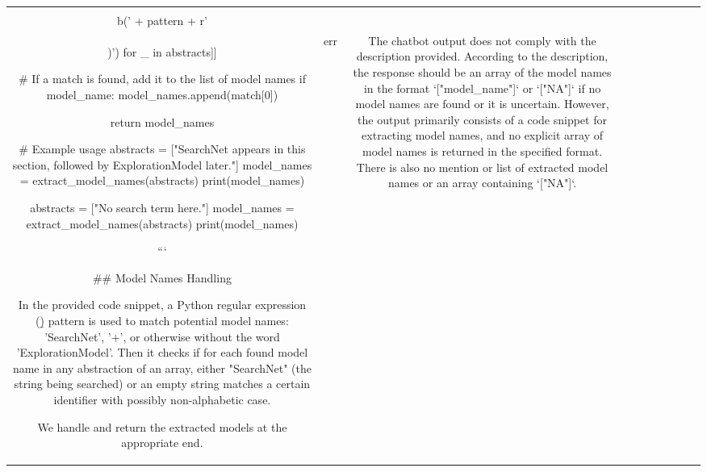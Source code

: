 \begin{table}[h!]
\begin{tabular}{|c|c|c|c|c|c|c|c|c|c|}
\[\[\[Here's how you can achieve this in Python:

```python
import re

def extract_model_names(abstracts):
    # Regular expression pattern to match model names
    pattern = r'\b(?:SearchNet|\w+)\s+([\_A-Z][a-z]+)\.?\w+\b'
    
    # Find model names in the abstracts
    model_names = []
    for abstract in abstracts:
        matches = re.findall(pattern, abstract)
        
        # Check if either "SearchNet" or "\w+" was found
        model_name = [match[0] if match[1] in ['SearchNet', '': None] else match[1] 
                     for match in [match.match('\\b(' + pattern + r'\\)') for _ in abstracts]]
        
        # If a match is found, add it to the list of model names
        if model_name:
            model_names.append(match[0])
    
    return model_names

# Example usage
abstracts = ["SearchNet appears in this section, followed by ExplorationModel later."]
model_names = extract_model_names(abstracts)
print(model_names)

abstracts = ["No search term here."]
model_names = extract_model_names(abstracts)
print(model_names)

```

## Model Names Handling

In the provided code snippet, a Python regular expression (\b) pattern is used to match potential model names: 'SearchNet', '\w+', or otherwise without the word 'ExplorationModel'. Then it checks if for each found model name in any abstraction of an array,  either "SearchNet" (the string being searched) or an empty string matches a certain identifier with possibly non-alphabetic case.

We handle and return the extracted models at the appropriate end. & err & The chatbot output does not comply with the description provided. According to the description, the response should be an array of the model names in the format `["model_name"]` or `["NA"]` if no model names are found or it is uncertain. However, the output primarily consists of a code snippet for extracting model names, and no explicit array of model names is returned in the specified format. There is also no mention or list of extracted model names or an array containing `["NA"]`. 

\]\]\]
\end{tabular}
\end{table}
